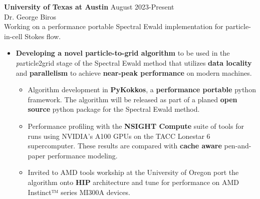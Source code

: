 \documentclass[resmargin, 10pt]{res} %
\begin{document}
\begin{resume}
{\bf University of Texas at Austin} \hfill August 2023-Present \\
Dr. George Biros \\
Working on a performance portable Spectral Ewald implementation for particle-in-cell Stokes flow.
\begin{itemize}[itemsep=0em]
    \item {\bf Developing a novel particle-to-grid algorithm} to be used in the {\emph particle2grid} stage of the Spectral Ewald method that utilizes {\bf data locality} and {\bf parallelism} to achieve {\bf near-peak performance} on modern machines.  
    \begin{itemize}[itemsep=0em]
        \item Algorithm development in {\bf PyKokkos}, a {\bf performance portable} python framework. The algorithm will be released as part of a planed {\bf open source} python package for the Spectral Ewald method. 
        \item Performance profiling with the {\bf NSIGHT Compute} suite of tools for runs using NVIDIA's A100 GPUs on the TACC Lonestar 6 supercomputer. These results are compared with {\bf cache aware} pen-and-paper performance modeling.
        \item Invited to AMD tools workship at the University of Oregon port the algorithm onto {\bf HIP} architecture and tune for performance on AMD Instinct™ series MI300A devices. 
    \end{itemize}
\end{itemize}


\end{resume}
\end{document}

